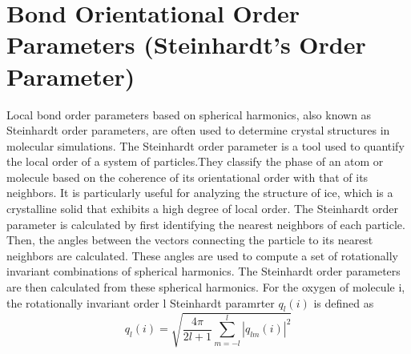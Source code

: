 \section{Bond Orientational Order Parameters (Steinhardt’s Order Parameter)}
Local bond order parameters based on spherical harmonics, also known as Steinhardt order parameters, are often used to determine crystal structures in molecular simulations\cite{Plimpton1995}.
The Steinhardt order parameter is a tool used to quantify the local order of a system of particles.They classify the phase of an atom or molecule based on the coherence of its orientational order with that of its neighbors. It is particularly useful for analyzing the structure of ice, which is a crystalline solid that exhibits a high degree of local order\cite{Reinhardt2012}.
The Steinhardt order parameter is calculated by first identifying the nearest neighbors of each particle. Then, the angles between the vectors connecting the particle to its nearest neighbors are calculated. These angles are used to compute a set of rotationally invariant combinations of spherical harmonics. The Steinhardt order parameters are then calculated from these spherical harmonics\cite{Lechner2008}. For the oxygen of molecule i, the rotationally invariant order l Steinhardt paramrter $q_l(i)$ is defined as 
\[ q_l(i) = \sqrt{\frac {4\pi}{2l+1}\sum_{m=-l}^l|q_{lm}(i)|^2} \]

